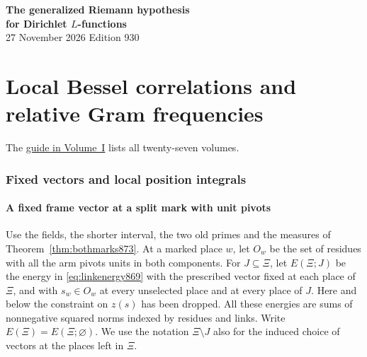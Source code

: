 \documentclass[a4paper,11pt]{article}
\theoremstyle{definition}
\theoremstyle{remark}
\numberwithin{equation}{section}
\begin{document}
\setcounter{part}{25}
\thispagestyle{plain}\begin{center}
{\LARGE\bfseries The generalized Riemann hypothesis\\[2pt]for Dirichlet \(L\)-functions}\\[6pt]
{\small 27 November 2026 \quad\textperiodcentered\quad Edition 930}\end{center}
\part{Local Bessel correlations and relative Gram frequencies}\label{part:XXVI}
\begin{abstract}\noindent We compute position integrals for marked vectors and bound the first relative Gram transform at split and inert finite places. The rational sum puts these estimates on the number fields and intervals of the projected period. Its real factor must be estimated at the corresponding archimedean frequencies.\end{abstract}
\setcounter{section}{135}
\noindent The \hyperref[seriesguide]{guide in Volume~I} lists all twenty-seven volumes.
\begingroup\small\setlength{\parskip}{0pt}\tableofcontents\endgroup
\clearpage

\section{Fixed vectors and local position integrals}\label{nav:marked-orbital-energy}\label{nav:volume-XXVI}

\subsection{A fixed frame vector at a split mark with unit pivots}
\label{sec:selectedopen874}

Use the fields, the shorter interval, the two old primes and the measures of
Theorem~\ref{thm:bothmarks873}. At a marked place \(w\), let \(O_w\) be the
set of residues with all the arm pivots units in both components. For
\(J\subseteq\Xi\), let \(E(\Xi;J)\) be the energy in
\eqref{eq:linkenergy869} with the prescribed vector fixed at each place of
\(\Xi\), and with \(s_w\in O_w\) at every unselected place and at every
place of \(J\). Here and below the constraint on \(z(s)\) has been dropped.
All these energies are sums of nonnegative squared norms indexed by
residues and links. Write \(E(\Xi)=E(\Xi;\varnothing)\). We use the notation
\(\Xi\setminus J\) also for the induced choice of vectors at the places left
in \(\Xi\).
\end{document}
